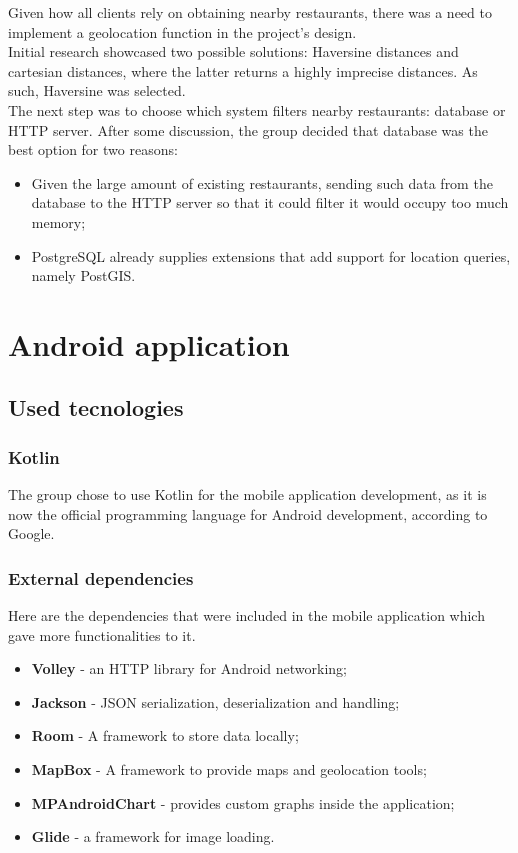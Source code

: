 Given how all clients rely on obtaining nearby restaurants, there was a need to implement a geolocation function in the project's design.\\

Initial research showcased two possible solutions: Haversine distances and cartesian distances, where the latter returns a highly imprecise distances.
As such, Haversine was selected.\\

The next step was to choose which system filters nearby restaurants: database or HTTP server. After some discussion, the group decided that database was the best
option for two reasons: 
\begin{itemize}
    \item Given the large amount of existing restaurants, sending such data from the database to the HTTP server so that it could filter it would occupy too much memory;
    \item PostgreSQL already supplies extensions that add support for location queries, namely PostGIS.
\end{itemize}

\section{Android application}

\subsection{Used tecnologies}

\subsubsection{Kotlin}

The group chose to use Kotlin for the mobile application development, as it is now the official programming language for Android development,
according to Google.\\

\subsubsection{External dependencies}

Here are the dependencies that were included in the mobile application which gave more functionalities to it.

\begin{itemize}
    \item \textbf{Volley} - an HTTP library for Android networking;
    \item \textbf{Jackson} - JSON serialization, deserialization and handling;
    \item \textbf{Room} - A framework to store data locally;
    \item \textbf{MapBox} - A framework to provide maps and geolocation tools;
    \item \textbf{MPAndroidChart} - provides custom graphs inside the application;
    \item \textbf{Glide} - a framework for image loading.
\end{itemize}

